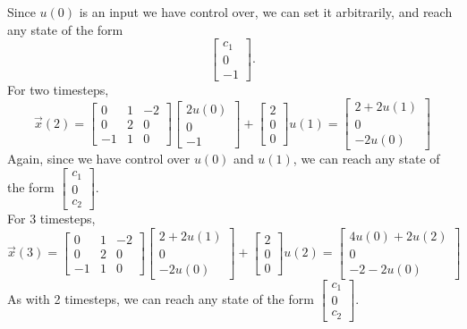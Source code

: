\begin{enumerate}
{        Since $u(0)$ is an input we have control over, we can set it arbitrarily, and reach any state of the form 
        \[ \begin{bmatrix} c_1 \\ 0 \\ -1\end{bmatrix}. \]
        For two timesteps,
        \[\vec{x}(2) = 
        \begin{bmatrix}
            0 & 1 & -2 \\
            0 & 2 & 0 \\
            -1 & 1 & 0
        \end{bmatrix} 
        \begin{bmatrix} 
            2u(0) \\ 0 \\ -1
        \end{bmatrix}
        + \begin{bmatrix}
            2 \\ 0 \\ 0
        \end{bmatrix} u(1) = 
        \begin{bmatrix} 
            2 + 2u(1) \\ 0 \\ -2u(0)
        \end{bmatrix}\]
        Again, since we have control over $u(0)$ and $u(1)$, we can reach any state of the form $\begin{bmatrix} c_1 \\ 0 \\ c_2 \end{bmatrix}$. \\
        \newline
        For 3 timesteps,
        \[\vec{x}(3) = 
        \begin{bmatrix}
            0 & 1 & -2 \\
            0 & 2 & 0 \\
            -1 & 1 & 0
        \end{bmatrix} 
        \begin{bmatrix} 
            2 + 2u(1) \\ 0 \\ -2u(0)
        \end{bmatrix}
        + \begin{bmatrix}
            2 \\ 0 \\ 0
        \end{bmatrix} u(2) = 
        \begin{bmatrix} 
            4u(0) + 2u(2) \\ 0 \\ -2 - 2u(0)
        \end{bmatrix}\]
        As with 2 timesteps, we can reach any state of the form $\begin{bmatrix} c_1 \\ 0 \\ c_2 \end{bmatrix}$.
    }


\end{enumerate}
